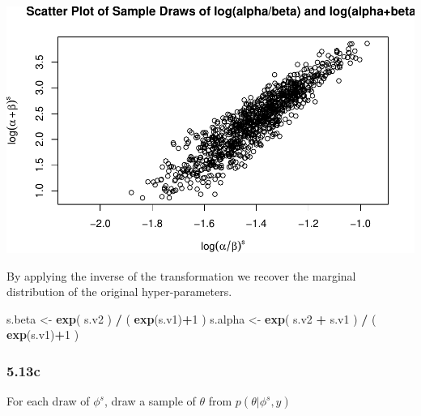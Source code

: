 \documentclass[]{article}
\newenvironment{Shaded}{\begin{snugshade}}{\end{snugshade}}
\newcommand{\KeywordTok}[1]{\textcolor[rgb]{0.13,0.29,0.53}{\textbf{#1}}}
\newcommand{\DecValTok}[1]{\textcolor[rgb]{0.00,0.00,0.81}{#1}}
\newcommand{\StringTok}[1]{\textcolor[rgb]{0.31,0.60,0.02}{#1}}
\newcommand{\OperatorTok}[1]{\textcolor[rgb]{0.81,0.36,0.00}{\textbf{#1}}}
\newcommand{\NormalTok}[1]{#1}
\begin{document}
\includegraphics{Untitled_files/figure-latex/unnamed-chunk-20-1.pdf}

By applying the inverse of the transformation we recover the marginal
distribution of the original hyper-parameters.

\begin{Shaded}
\begin{Highlighting}[]
\NormalTok{s.beta          <-}\StringTok{  }\KeywordTok{exp}\NormalTok{( s.v2 ) }\OperatorTok{/}\StringTok{ }\NormalTok{( }\KeywordTok{exp}\NormalTok{(s.v1)}\OperatorTok{+}\DecValTok{1}\NormalTok{ )}
\NormalTok{s.alpha         <-}\StringTok{  }\KeywordTok{exp}\NormalTok{( s.v2 }\OperatorTok{+}\StringTok{ }\NormalTok{s.v1 ) }\OperatorTok{/}\StringTok{ }\NormalTok{( }\KeywordTok{exp}\NormalTok{(s.v1)}\OperatorTok{+}\DecValTok{1}\NormalTok{ )  }
\end{Highlighting}
\end{Shaded}

\subsubsection{5.13c}\label{c-3}

For each draw of \(\phi^{s}\), draw a sample of \(\theta\) from
\(p(\theta|\phi^{s},y)\)
\end{document}
